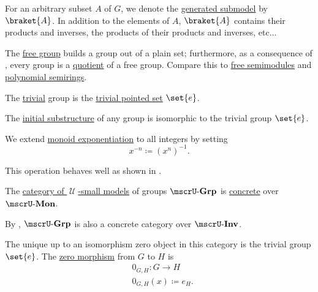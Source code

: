 \begin{definition}
\begin{thmenum}
    For an arbitrary subset \( A \) of \( G \), we denote the \hyperref[def:first_order_generated_substructure]{generated submodel} by \( \braket{ A } \). In addition to the elements of \( A \), \( \braket{ A } \) contains their products and inverses, the products of their products and inverses, etc...

    The \hyperref[def:free_group]{free group} builds a group out of a plain set; furthermore, as a consequence of , every group is a \hyperref[def:group/quotient]{quotient} of a free group. Compare this to \hyperref[def:free_semimodule]{free semimodules} and \hyperref[def:polynomial_algebra]{polynomial semirings}.

     The \hyperref[rem:trivial_structure]{trivial} group is the \hyperref[rem:pointed_set/trivial]{trivial pointed set} \( \set{ e } \).

     The \hyperref[thm:substructures_form_complete_lattice/bottom]{initial substructure} of any group is isomorphic to the trivial group \( \set{ e } \).

     We extend \hyperref[def:monoid/exponentiation]{monoid exponentiation} to all integers by setting
    \begin{equation*}
      x^{-n} \coloneqq (x^n)^{-1}.
    \end{equation*}

    This operation behaves well as shown in .

     The \hyperref[def:category_of_small_first_order_models]{category of \( \mscrU \)-small models} of groups \( \ucat{Grp} \) is \hyperref[def:concrete_category]{concrete} over \hyperref[def:monoid]{\( \ucat{Mon} \)}.

    By , \( \ucat{Grp} \) is also a concrete category over \( \ucat{Inv} \).

    The unique up to an isomorphism zero object in this category is the trivial group \( \set{ e } \). The \hyperref[def:zero_morphisms/morphism]{zero morphism} from \( G \) to \( H \) is
    \begin{equation*}
      \begin{aligned}
        &0_{G,H}: G \to H \\
        &0_{G,H}(x) \coloneqq e_H.
      \end{aligned}
    \end{equation*}


\end{thmenum}
\end{definition}
